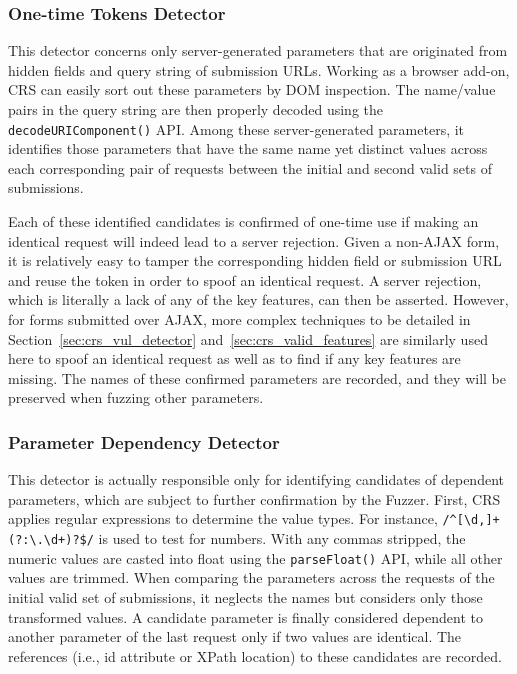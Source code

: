 \documentclass[letter]{sig-alternate-2013}
\begin{document}
\subsubsection{One-time Tokens Detector}
This detector concerns only server-generated parameters that are originated from hidden fields and query string of submission URLs. Working as a browser add-on, CRS can easily sort out these parameters by DOM inspection. The name/value pairs in the query string are then properly decoded using the \verb"decodeURIComponent()" API. Among these server-generated parameters, it identifies those parameters that have the same name yet distinct values across each corresponding pair of requests between the initial and second valid sets of submissions. 

Each of these identified candidates is confirmed of one-time use if making an identical request will indeed lead to a server rejection. Given a non-AJAX form, it is relatively easy to tamper the corresponding hidden field or submission URL and reuse the token in order to spoof an identical request. A server rejection, which is literally a lack of any of the key features, can then be asserted. However, for forms submitted over AJAX, more complex techniques to be detailed in Section~\ref{sec:crs_vul_detector} and~\ref{sec:crs_valid_features} are similarly used here to spoof an identical request as well as to find if any key features are missing. The names of these confirmed parameters are recorded, and they will be preserved when fuzzing other parameters. 

\subsubsection{Parameter Dependency Detector}
This detector is actually responsible only for identifying candidates of dependent parameters, which are subject to further confirmation by the Fuzzer. First, CRS applies regular expressions to determine the value types. For instance, \verb"/^[\d,]+(?:\.\d+)?$/" is used to test for numbers. With any commas stripped, the numeric values are casted into float using the \verb"parseFloat()" API, while all other values are trimmed. When comparing the parameters across the requests of the initial valid set of submissions, it neglects the names but considers only those transformed values. A candidate parameter is finally considered dependent to another parameter of the last request only if two values are identical. The references (i.e., id attribute or XPath location) to these candidates are recorded.
\end{document}
